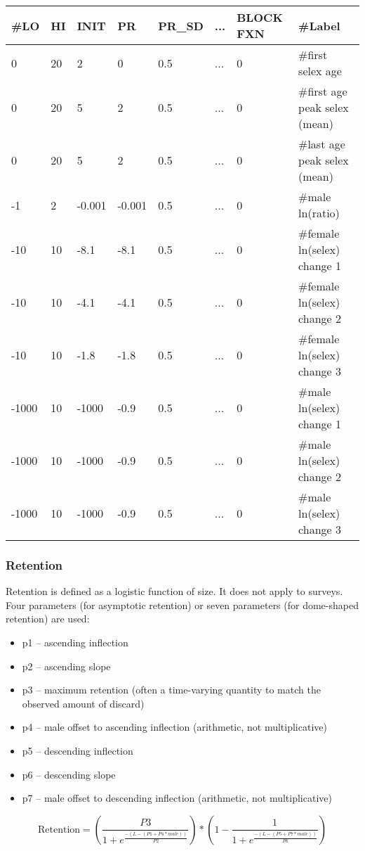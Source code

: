\begin{description}
		\begin{center}
			\begin{longtable}{p{0.8cm} p{0.8cm} p{1cm} p{0.8cm} p{1.75cm}p{1cm} p{1.2cm} p{5.2cm}}
				\hline
				\#LO & HI & INIT & PR & PR\_SD  & ... & BLOCK FXN & \#Label \\
				\hline
				0 & 20 &  2 &  0 & 0.5  & ... & 0 & \#first selex age \\
				0 & 20 &  5 &  2 & 0.5  & ... & 0 & \#first age peak selex (mean) \\
				0 & 20 &  5 &  2 & 0.5  & ... & 0 & \#last age peak selex (mean) \\
				-1  &  2 & -0.001 & -0.001 & 0.5  & ... & 0 & \#male ln(ratio) \\
				-10 & 10 & -8.1   &  -8.1 & 0.5  & ... & 0 & \#female ln(selex) change 1\\
				-10 & 10 & -4.1   & -4.1 & 0.5  & ... & 0 & \#female ln(selex) change 2\\
				-10 & 10 & -1.8   & -1.8 & 0.5  & ... & 0 & \#female ln(selex) change 3\\
				-1000 & 10 & -1000 & -0.9 & 0.5  & ... & 0 & \#male ln(selex) change 1\\
				-1000 & 10 & -1000 & -0.9 & 0.5  & ... & 0 & \#male ln(selex) change 2\\
				-1000 & 10 & -1000 & -0.9 & 0.5  & ... & 0 & \#male ln(selex) change 3\\
				\hline
			\end{longtable}
		\end{center}	
\end{description}


\subsubsection{Retention}
Retention is defined as a logistic function of size.  It does not apply to surveys.  Four parameters (for asymptotic retention) or seven parameters (for dome-shaped retention) are used:
\begin{itemize}
	\item p1 – ascending inflection
	\item p2 – ascending slope
	\item p3 – maximum retention (often a time-varying quantity to match the observed amount of discard)
	\item p4 – male offset to ascending inflection (arithmetic, not multiplicative)
	\item p5 – descending inflection
	\item p6 – descending slope
	\item p7 – male offset to descending inflection (arithmetic, not multiplicative)
\end{itemize}
\begin{equation}
	\text{Retention} = \left(\frac{P3}{1 + e^{\frac{-(L-(P1+P4*male))}{P2}}}\right)*\left(1 - \frac{1}{1 + e^{\frac{-(L-(P5+P7*male))}{P6}}}\right)
\end{equation}

